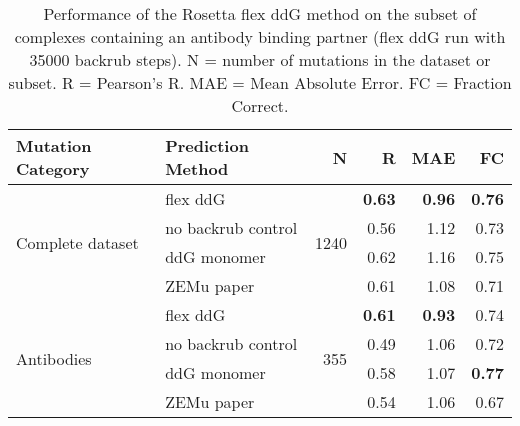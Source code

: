\begin{table}
  \begin{tabular}{llrrrr}
\toprule
Mutation Category &   Prediction Method &     N &    R &  MAE &   FC \\
\midrule
 \multirow{ 4}{*}{Complete dataset} & flex ddG & \multirow{ 4}{*}{1240} & \textbf{0.63} & \textbf{0.96} & \textbf{0.76}  \\
 & no backrub control & & 0.56 & 1.12 & 0.73  \\
 & ddG monomer & & 0.62 & 1.16 & 0.75  \\
 & ZEMu paper & & 0.61 & 1.08 & 0.71  \\
\hline
 \multirow{ 4}{*}{Antibodies} & flex ddG & \multirow{ 4}{*}{355} & \textbf{0.61} & \textbf{0.93} & 0.74  \\
 & no backrub control & & 0.49 & 1.06 & 0.72  \\
 & ddG monomer & & 0.58 & 1.07 & \textbf{0.77}  \\
 & ZEMu paper & & 0.54 & 1.06 & 0.67  \\
\bottomrule
\end{tabular}
  \caption[Flex ddG performance on antibodies]{
    Performance of the Rosetta flex ddG method on the subset of complexes containing an antibody binding partner (flex ddG run with 35000 backrub steps). N = number of mutations in the dataset or subset. R = Pearson's R. MAE = Mean Absolute Error. FC = Fraction Correct.
  } \label{tab:table-antibodies}
\end{table}
